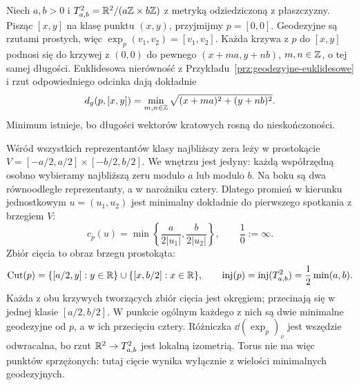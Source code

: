 \begin{przyklad}
\label{prz:ciecie-torus}
Niech $a,b>0$ i
$T^2_{a,b}=\mathbb{R}^2/(a\mathbb{Z}\times b\mathbb{Z})$ z metryką
odziedziczoną z płaszczyzny. Pisząc $[x,y]$
na klasę punktu $(x,y)$, przyjmijmy $p=[0,0]$.
Geodezyjne są rzutami prostych, więc
$\exp_p(v_1,v_2)=[v_1,v_2]$.
Każda krzywa z $p$ do $[x,y]$ podnosi się do
krzywej z $(0,0)$ do pewnego
$(x+ma,y+nb)$, $m,n\in\mathbb{Z}$, o tej samej długości.
Euklidesowa nierówność z
Przykładu~\ref{prz:geodezyjne-euklidesowe}
i rzut odpowiedniego odcinka dają dokładnie
\begin{equation}\label{eq:odleglosc-torus-ciecie}
 d_g(p,[x,y])
 =\min_{m,n\in\mathbb{Z}}
   \sqrt{(x+ma)^2+(y+nb)^2}.
\end{equation}
Minimum istnieje, bo długości wektorów kratowych
rosną do nieskończoności.

Wśród wszystkich reprezentantów klasy najbliższy
zera leży w prostokącie
$V=[-a/2,a/2]\times[-b/2,b/2]$.
We wnętrzu jest jedyny: każdą współrzędną
osobno wybieramy najbliższą zeru modulo $a$
lub modulo $b$. Na boku są dwa równoodległe
reprezentanty, a w narożniku cztery.
Dlatego promień w kierunku jednostkowym
$u=(u_1,u_2)$ jest minimalny dokładnie do
pierwszego spotkania z brzegiem $V$:
\[
 c_p(u)=
 \min\left\{\frac{a}{2|u_1|},
             \frac{b}{2|u_2|}\right\},
 \qquad \frac1{0}:=\infty.
\]
Zbiór cięcia to obraz brzegu prostokąta:
\[
 \operatorname{Cut}(p)
 =\{[a/2,y]:y\in\mathbb{R}\}
   \cup\{[x,b/2]:x\in\mathbb{R}\},
 \qquad
 \operatorname{inj}(p)
 =\operatorname{inj}(T^2_{a,b})
 =\frac12\min(a,b).
\]
Każda z obu krzywych tworzących zbiór cięcia
jest okręgiem; przecinają się w jednej
klasie $[a/2,b/2]$.
W punkcie ogólnym każdego z nich są dwie
minimalne geodezyjne od $p$, a w ich przecięciu
cztery. Różniczka $\dd(\exp_p)_v$ jest wszędzie
odwracalna, bo rzut $\mathbb{R}^2\to T^2_{a,b}$
jest lokalną izometrią. Torus nie ma więc
punktów sprzężonych: tutaj cięcie wynika
wyłącznie z wielości minimalnych geodezyjnych.
\end{przyklad}

